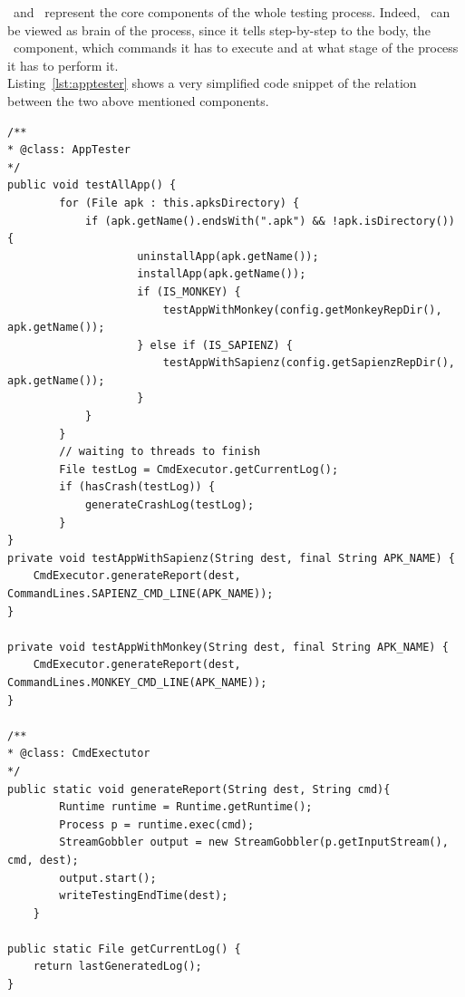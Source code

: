\AppTester\ and \Cmd\ represent the core components of the whole testing process. Indeed, \AppTester\ can be viewed as brain of the process, since it tells step-by-step to the body, \ie the \Cmd\ component, which commands it has to execute and at what stage of the process it has to perform it. \\
Listing~\ref{lst:apptester} shows a very simplified code snippet of the relation between the two above mentioned components. 
\begin{lstlisting}[caption=Testing mechanism between \AppTester\ and \Cmd\, ,label={lst:apptester}]
/**
* @class: AppTester
*/
public void testAllApp() {
        for (File apk : this.apksDirectory) {
            if (apk.getName().endsWith(".apk") && !apk.isDirectory()) {
                    uninstallApp(apk.getName());
                    installApp(apk.getName());
                    if (IS_MONKEY) {
                        testAppWithMonkey(config.getMonkeyRepDir(), apk.getName());
                    } else if (IS_SAPIENZ) {
                        testAppWithSapienz(config.getSapienzRepDir(), apk.getName());
                    }
            }
        } 
        // waiting to threads to finish 
        File testLog = CmdExecutor.getCurrentLog();
        if (hasCrash(testLog)) {
            generateCrashLog(testLog);
        }
} 
private void testAppWithSapienz(String dest, final String APK_NAME) {
	CmdExecutor.generateReport(dest, CommandLines.SAPIENZ_CMD_LINE(APK_NAME)); 
}

private void testAppWithMonkey(String dest, final String APK_NAME) {
	CmdExecutor.generateReport(dest, CommandLines.MONKEY_CMD_LINE(APK_NAME)); 
}

/**
* @class: CmdExectutor
*/
public static void generateReport(String dest, String cmd){
        Runtime runtime = Runtime.getRuntime();
        Process p = runtime.exec(cmd);
        StreamGobbler output = new StreamGobbler(p.getInputStream(), cmd, dest); 
        output.start();
        writeTestingEndTime(dest);
    }
    
public static File getCurrentLog() {
    return lastGeneratedLog();
}
    
\end{lstlisting}


